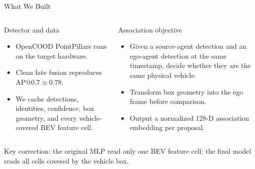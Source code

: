 \documentclass[aspectratio=169,10pt]{beamer}
\begin{document}
\begin{frame}{What We Built}
\begin{columns}[T,onlytextwidth]
\begin{block}{Detector and data}
\begin{itemize}
  \item OpenCOOD PointPillars runs on the target hardware.
  \item Clean late fusion reproduces $\mathrm{AP@0.7}\approx0.78$.
  \item We cache detections, identities, confidence, box geometry, and every
  vehicle-covered BEV feature cell.
\end{itemize}
\end{block}

\begin{block}{Association objective}
\begin{itemize}
  \item Given a source-agent detection and an ego-agent detection at the
  same timestamp, decide whether they are the same physical vehicle.
  \item Transform box geometry into the ego frame before comparison.
  \item Output a normalized 128-D association embedding per proposal.
\end{itemize}
\end{block}
\end{columns}

\vspace{3mm}
\centering
\alert{Key correction:} the original MLP read only one BEV feature cell;
the final model reads all cells covered by the vehicle box.
\end{frame}
\end{document}
